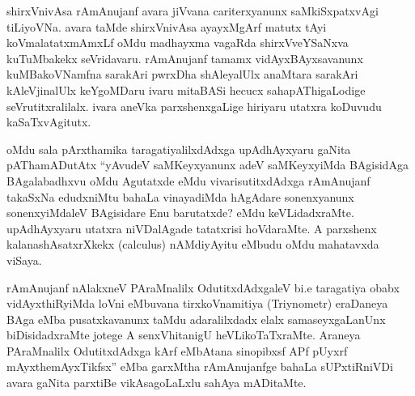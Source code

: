 shirxVnivAsa rAmAnujanf avara jiVvana cariterxyanunx saMkiSxpatxvAgi tiLiyoVNa. avara taMde shirxVnivAsa ayayxMgArf matutx tAyi koVmalatatxmAmxLf oMdu madhayxma vagaRda shirxVveYSaNxva kuTuMbakekx seVridavaru. rAmAnujanf tamamx vidAyxBAyxsavanunx kuMBakoVNamfna sarakAri pwrxDha shAleyalUlx anaMtara sarakAri kAleVjinalUlx keYgoMDaru ivaru mitaBASi hecucx sahapAThigaLodige seVrutitxralilalx. ivara aneVka parxshenxgaLige hiriyaru utatxra koDuvudu kaSaTxvAgitutx.

oMdu sala pArxthamika taragatiyalilxdAdxga upAdhAyxyaru gaNita pAThamADutAtx ``yAvudeV saMKeyxyanunx adeV saMKeyxyiMda BAgisidAga BAgalabadhxvu oMdu Agutatxde eMdu vivarisutitxdAdxga rAmAnujanf takaSxNa edudxniMtu bahaLa vinayadiMda hAgAdare sonenxyanunx sonenxyiMdaleV BAgisidare Enu barutatxde? eMdu keVLidadxraMte. upAdhAyxyaru utatxra niVDalAgade tatatxrisi hoVdaraMte. A parxshenx kalanashAsatxrXkekx {\rm (calculus)} nAMdiyAyitu eMbudu oMdu mahatavxda viSaya. 

rAmAnujanf nAlakxneV PAraMnalilx OdutitxdAdxgaleV bi.e taragatiya obabx vidAyxthiRyiMda loVni eMbuvana tirxkoVnamitiya {\rm (Triynometr)} eraDaneya BAga eMba pusatxkavanunx taMdu adaralilxdadx elalx samaseyxgaLanUnx biDisidadxraMte jotege A senxVhitanigU heVLikoTaTxraMte. Araneya PAraMnalilx OdutitxdAdxga kArf eMbAtana sinopibxsf APf pUyxrf mAyxthemAyxTikfsx'' eMba garxMtha rAmAnujanfge bahaLa sUPxtiRniVDi avara gaNita parxtiBe vikAsagoLaLxlu sahAya mADitaMte.


